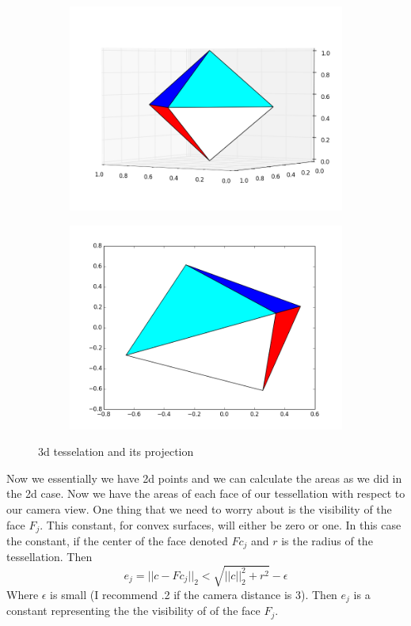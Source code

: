 \begin{figure}
\begin{subfigure}{.49\textwidth}
\includegraphics[width=\textwidth]{3dbefore.png}
\end{subfigure}
\begin{subfigure}{.49\textwidth}
\includegraphics[width=\textwidth]{projection.png}
\end{subfigure}
\caption{3d tesselation and its projection}
\label{fig:proj}
\end{figure}

Now we essentially we have 2d points and we can calculate the areas as we did in the 2d case. Now we have the areas of each face of our tessellation with respect to our camera view. One thing that we need to worry about is the visibility of the face $F_j$. This constant, for convex surfaces, will either be zero or one. In this case the constant, if the center of the face denoted $Fc_j$ and $r$ is the radius of the tessellation. Then
\[
e_j=||c-Fc_j||_2<\sqrt{||c||_2^2+r^2}-\epsilon
\] 
Where $\epsilon$ is small (I recommend .2 if the camera distance is 3).
Then $e_j$ is a constant representing the  the visibility of of the face $F_j$.


